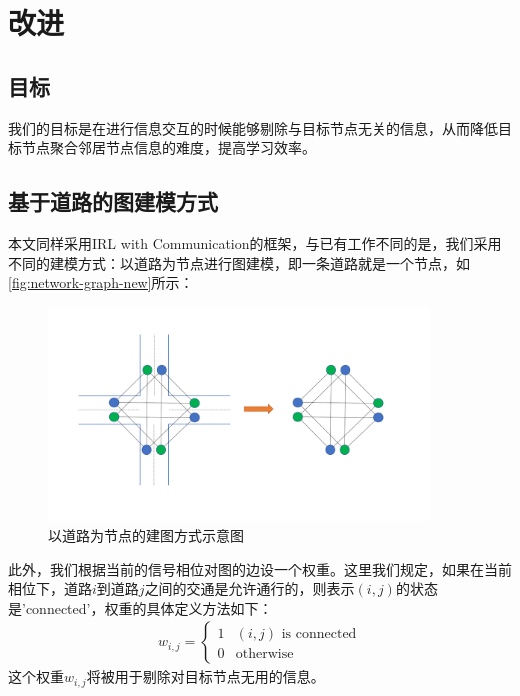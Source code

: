 \section{改进}
\subsection{目标}
我们的目标是在进行信息交互的时候能够剔除与目标节点无关的信息，从而降低目标节点聚合邻居节点信息的难度，提高学习效率。

\subsection{基于道路的图建模方式}
本文同样采用IRL with Communication的框架，与已有工作不同的是，我们采用不同的建模方式：以道路为节点进行图建模，即一条道路就是一个节点，如\autoref{fig:network-graph-new}所示：
\begin{figure}[htb]
  \includegraphics[width=0.9\textwidth]{ppt/graph-modeling.pdf}
  \caption{以道路为节点的建图方式示意图}
  \label{fig:network-graph-new}
\end{figure}

此外，我们根据当前的信号相位对图的边设一个权重。这里我们规定，如果在当前相位下，道路$i$到道路$j$之间的交通是允许通行的，则表示$(i,j)$的状态是'connected'，权重的具体定义方法如下：
\begin{align}
  w_{i,j} = \begin{cases}
    1 & (i, j) \text{ is connected} \\
    0 & \text{otherwise}
  \end{cases}
\end{align}
这个权重$w_{i,j}$将被用于剔除对目标节点无用的信息。

